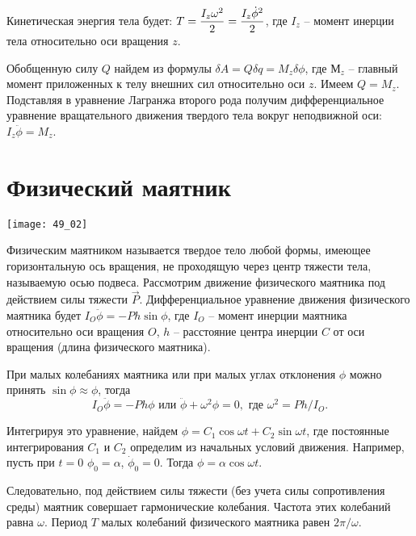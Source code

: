 Кинетическая энергия тела будет:
\( \displaystyle T = \frac{I_z\omega^2}{2} = \frac{I_z\dot{\phi}^2}{2} \), 
где \( I_z \) -- момент инерции тела относительно оси вращения \( z \).

Обобщенную силу \( Q \) найдем из формулы
\( \delta A = Q\delta q = M_z\delta\phi \), где \( М_z \) -- главный момент
приложенных к телу внешних сил относительно оси \( z \). Имеем \( Q = M_z \).
Подставляя в уравнение Лагранжа второго рода получим дифференциальное уравнение
вращательного движения твердого тела вокруг неподвижной оси:
\( I_z\ddot{\phi} = M_z \).

\section{Физический маятник}
\begin{minipage}{.35\textwidth}
    \texttt{[image: 49\_02]}
\end{minipage}
\begin{minipage}{.6\textwidth}
Физическим маятником называется твердое тело любой формы, имеющее горизонтальную
ось вращения, не проходящую через центр тяжести тела, называемую осью подвеса.
Рассмотрим движение физического маятника под действием силы тяжести
\( \vec{P} \). Дифференциальное уравнение движения физического маятника будет
\( I_O\ddot{\phi} = -Ph\sin\phi \), где \( I_O \) -- момент инерции маятника
относительно оси вращения \( O \), \( h \) -- расстояние центра инерции \( C \)
от оси вращения (длина физического маятника).
\end{minipage}

При малых колебаниях маятника или при малых углах отклонения \( \phi \) можно
принять \( \sin\phi \approx \phi \), тогда
\[
    I_O\ddot{\phi} = -Ph\phi \text{ или } \ddot{\phi} + \omega^2\phi = 0,
    \text{ где } \omega^2 = Ph/I_O.
\]

Интегрируя это уравнение, найдем \( \phi = C_1\cos\omega t + C_2\sin\omega t \),
где постоянные интегрирования \( C_1 \) и \( C_2 \) определим из начальных
условий движения. Например, пусть при \( t = 0 \) \( \phi_0 = \alpha \),
\( \dot{\phi}_0 = 0 \). Тогда \( \phi =\alpha\cos\omega t \).

Следовательно, под действием силы тяжести (без учета силы сопротивления среды)
маятник совершает гармонические колебания. Частота этих колебаний равна
\( \omega \). Период \( T \) малых колебаний физического маятника равен
\( 2\pi/\omega \).

\newpage
